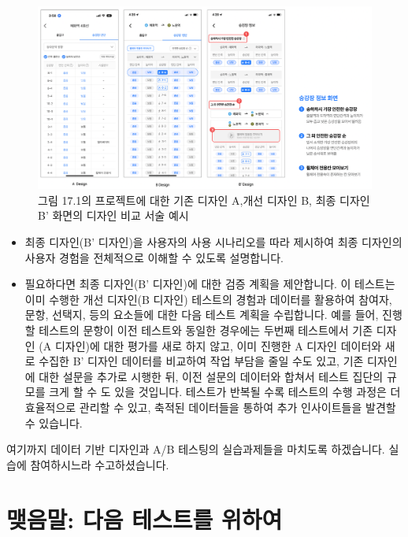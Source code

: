 \documentclass[
  letterpaper,
]{book}
\providecommand{\tightlist}{%
  \setlength{\itemsep}{0pt}\setlength{\parskip}{0pt}}\usepackage{longtable,booktabs,array}
\begin{document}
\begin{figure}[H]

{\centering \includegraphics{img/fig33.png}

}

\caption{그림 17.1의 프로젝트에 대한 기존 디자인 A,개선 디자인 B, 최종
디자인 B' 화면의 디자인 비교 서술 예시}

\end{figure}%

\begin{itemize}
\tightlist
\item
  최종 디자인(B' 디자인)을 사용자의 사용 시나리오를 따라 제시하여 최종
  디자인의 사용자 경험을 전체적으로 이해할 수 있도록 설명합니다.
\item
  필요하다면 최종 디자인(B' 디자인)에 대한 검증 계획을 제안합니다. 이
  테스트는 이미 수행한 개선 디자인(B 디자인) 테스트의 경험과 데이터를
  활용하여 참여자, 문항, 선택지, 등의 요소들에 대한 다음 테스트 계획을
  수립합니다. 예를 들어, 진행할 테스트의 문항이 이전 테스트와 동일한
  경우에는 두번째 테스트에서 기존 디자인 (A 디자인)에 대한 평가를 새로
  하지 않고, 이미 진행한 A 디자인 데이터와 새로 수집한 B' 디자인
  데이터를 비교하여 작업 부담을 줄일 수도 있고, 기존 디자인에 대한
  설문을 추가로 시행한 뒤, 이전 설문의 데이터와 합쳐서 테스트 집단의
  규모를 크게 할 수 도 있을 것입니다. 테스트가 반복될 수록 테스트의 수행
  과정은 더 효율적으로 관리할 수 있고, 축적된 데이터들을 통하여 추가
  인사이트들을 발견할 수 있습니다.
\end{itemize}

여기까지 데이터 기반 디자인과 A/B 테스팅의 실습과제들을 마치도록
하겠습니다. 실습에 참여하시느라 수고하셨습니다.


\chapter{맺음말: 다음 테스트를
위하여}\label{uxb9fauxc74cuxb9d0-uxb2e4uxc74c-uxd14cuxc2a4uxd2b8uxb97c-uxc704uxd558uxc5ec}
\end{document}

